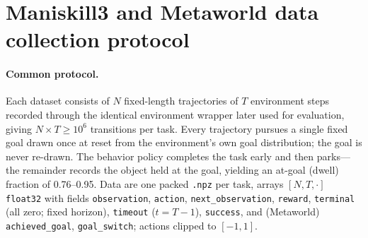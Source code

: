 \documentclass[10pt]{article}
\begin{document}

\section{Maniskill3 and Metaworld data collection protocol}

\paragraph{Common protocol.}
Each dataset consists of $N$ fixed-length trajectories of $T$ environment steps recorded through the identical environment wrapper later used for evaluation, giving $N \times T \geq 10^6$ transitions per task. Every trajectory pursues a single fixed goal drawn once at reset from the environment's own goal distribution; the goal is never re-drawn. The behavior policy completes the task early and then parks---the remainder records the object held at the goal, yielding an at-goal (dwell) fraction of 0.76--0.95. Data are one packed \texttt{.npz} per task, arrays $[N,T,\cdot]$ \texttt{float32} with fields \texttt{observation}, \texttt{action}, \texttt{next\_observation}, \texttt{reward}, \texttt{terminal} (all zero; fixed horizon), \texttt{timeout} ($t=T-1$), \texttt{success}, and (Metaworld) \texttt{achieved\_goal}, \texttt{goal\_switch}; actions clipped to $[-1,1]$.
\end{document}
